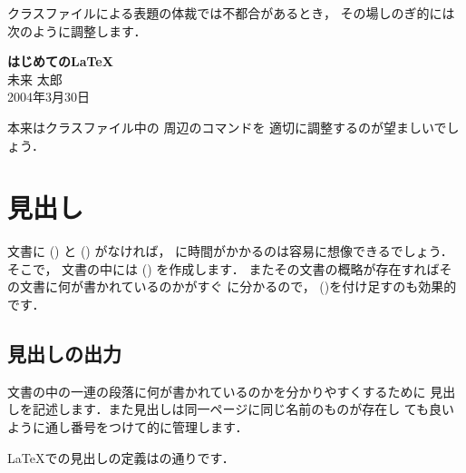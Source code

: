 \begin{Exe}
クラスファイルによる表題の体裁では不都合があるとき，
その場しのぎ的には次のように調整します．

\begin{InTeX}
\begin{center}
{\LARGE \textbf{はじめての\LaTeX }}\\[2em]
{\large 未来 太郎}\\[1em]
{2004年3月30日}\\[1em]
\end{center} 
\end{InTeX}

本来はクラスファイル中の  周辺のコマンドを
適切に調整するのが望ましいでしょう．
\end{Exe}

\section{見出し}%
文書に () と () がなければ，
に時間がかかるのは容易に想像できるでしょう．そこで，
文書の中には () を作成します．
%
またその文書の概略が存在すればその文書に何が書かれているのかがすぐ
に分かるので， ()を付け足すのも効果的です．


\subsection{見出しの出力}%
文書の中の一連の段落に何が書かれているのかを分かりやすくするために
見出しを記述します．また見出しは同一ページに同じ名前のものが存在し
ても良いように通し番号をつけて的に管理します．

{\LaTeX}での見出しの定義はの通りです．%

